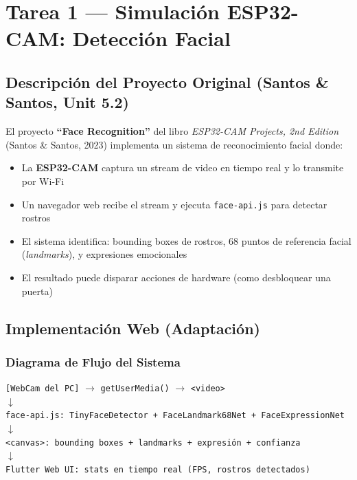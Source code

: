\documentclass[12pt,a4paper]{article}
\begin{document}
\section{Tarea 1 — Simulación ESP32-CAM: Detección Facial}

\subsection{Descripción del Proyecto Original (Santos \& Santos, Unit 5.2)}

El proyecto \textbf{``Face Recognition''} del libro \textit{ESP32-CAM Projects, 2nd Edition} (Santos \& Santos, 2023) implementa un sistema de reconocimiento facial donde:

\begin{itemize}[leftmargin=*, itemsep=3pt]
  \item La \textbf{ESP32-CAM} captura un stream de video en tiempo real y lo transmite por Wi-Fi
  \item Un navegador web recibe el stream y ejecuta \texttt{face-api.js} para detectar rostros
  \item El sistema identifica: bounding boxes de rostros, 68 puntos de referencia facial (\textit{landmarks}), y expresiones emocionales
  \item El resultado puede disparar acciones de hardware (como desbloquear una puerta)
\end{itemize}

\subsection{Implementación Web (Adaptación)}

\subsubsection{Diagrama de Flujo del Sistema}

\begin{center}
\begin{tcolorbox}[infobox, width=14cm]
  \texttt{[WebCam del PC]} $\longrightarrow$ \texttt{getUserMedia()} $\longrightarrow$ \texttt{<video>}\\
  $\downarrow$\\
  \texttt{face-api.js: TinyFaceDetector + FaceLandmark68Net + FaceExpressionNet}\\
  $\downarrow$\\
  \texttt{<canvas>: bounding boxes + landmarks + expresión + confianza}\\
  $\downarrow$\\
  \texttt{Flutter Web UI: stats en tiempo real (FPS, rostros detectados)}
\end{tcolorbox}
\end{center}
\end{document}
